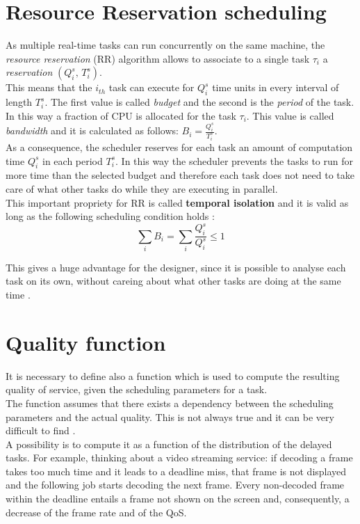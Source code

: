 \section{Resource Reservation scheduling}
As multiple real-time tasks can run concurrently on the same machine, the \emph{resource reservation} (RR) algorithm allows to associate to a single task \( \tau_{i} \) a \emph{reservation} \( \left(Q_{i}^s,\,T_{i}^s\right) \).\\ 
This means that the \( i_{th} \) task can execute for \( Q_{i}^s \) time units in every interval of length \( T_{i}^s \). The first value is called \emph{budget} and the second is the \emph{period} of the task.\\
In this way a fraction of CPU is allocated for the task \( \tau_{i} \). This value is called \emph{bandwidth} and it is calculated as follows: \( B_{i} = \frac{Q_{i}^s}{T_{i}^s}\).\\
As a consequence, the scheduler reserves for each task an amount of computation time \( Q_{i}^s \) in each period \( T_{i}^s \). In this way the scheduler prevents the tasks to run for more time than the selected budget and therefore each task does not need to take care of what other tasks do while they are executing in parallel.\\
This important propriety for RR is called \textbf{temporal isolation} and it is valid as long as the following scheduling condition holds \cite{realtimehandbook}:
\begin{equation} \tag{1} \label{schedCond}
  \displaystyle\sum_{i} B_{i} =  \displaystyle\sum_{i} \frac{Q_{i}^s}{Q_{i}^s} \leq 1
\end{equation}

This gives a huge advantage for the designer, since it is possible to analyse each task on its own, without careing about what other tasks are doing at the same time \cite{probGuarantees}.

\section{Quality function}
It is necessary to define also a function which is used to compute the resulting quality of service, given the scheduling parameters for a task.\\
The function assumes that there exists a dependency between the scheduling parameters and the actual quality. This is not always true and it can be very difficult to find \cite{prosit}.\\
A possibility is to compute it as a function of the distribution of the delayed tasks. For example, thinking about a video streaming service: if decoding a frame takes too much time and it leads to a deadline miss, that frame is not displayed and the following job starts decoding the next frame. Every non-decoded frame within the deadline entails a frame not shown on the screen and, consequently, a decrease of the frame rate and of the QoS. 


